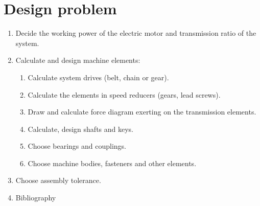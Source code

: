 \section{Design problem}
\begin{enumerate}
	\item Decide the working power of the electric motor and transmission ratio of the system.
	\item Calculate and design machine elements:
	\begin{enumerate}
		\item Calculate system drives (belt, chain or gear).
		\item Calculate the elements in speed reducers (gears, lead screws).
		\item Draw and calculate force diagram exerting on the transmission elements.
		\item Calculate, design shafts and keys.
		\item Choose bearings and couplings.
		\item Choose machine bodies, fasteners and other elements.
	\end{enumerate}
	\item Choose assembly tolerance.
	\item Bibliography
\end{enumerate}

